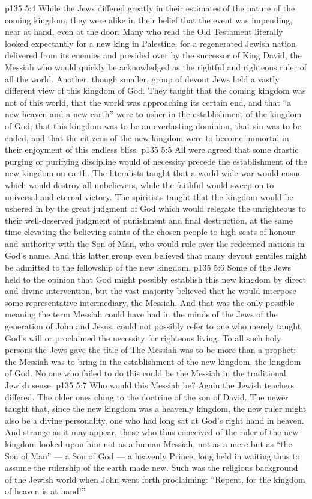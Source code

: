 \vs p135 5:4 While the Jews differed greatly in their estimates of the nature of the coming kingdom, they were alike in their belief that the event was impending, near at hand, even at the door. Many who read the Old Testament literally looked expectantly for a new king in Palestine, for a regenerated Jewish nation delivered from its enemies and presided over by the successor of King David, the Messiah who would quickly be acknowledged as the rightful and righteous ruler of all the world. Another, though smaller, group of devout Jews held a vastly different view of this kingdom of God. They taught that the coming kingdom was not of this world, that the world was approaching its certain end, and that “a new heaven and a new earth” were to usher in the establishment of the kingdom of God; that this kingdom was to be an everlasting dominion, that sin was to be ended, and that the citizens of the new kingdom were to become immortal in their enjoyment of this endless bliss.
\vs p135 5:5 All were agreed that some drastic purging or purifying discipline would of necessity precede the establishment of the new kingdom on earth. The literalists taught that a world\hyp{}wide war would ensue which would destroy all unbelievers, while the faithful would sweep on to universal and eternal victory. The spiritists taught that the kingdom would be ushered in by the great judgment of God which would relegate the unrighteous to their well\hyp{}deserved judgment of punishment and final destruction, at the same time elevating the believing saints of the chosen people to high seats of honour and authority with the Son of Man, who would rule over the redeemed nations in God’s name. And this latter group even believed that many devout gentiles might be admitted to the fellowship of the new kingdom.
\vs p135 5:6 Some of the Jews held to the opinion that God might possibly establish this new kingdom by direct and divine intervention, but the vast majority believed that he would interpose some representative intermediary, the Messiah. And that was the only possible meaning the term Messiah could have had in the minds of the Jews of the generation of John and Jesus.  could not possibly refer to one who merely taught God’s will or proclaimed the necessity for righteous living. To all such holy persons the Jews gave the title of  The Messiah was to be more than a prophet; the Messiah was to bring in the establishment of the new kingdom, the kingdom of God. No one who failed to do this could be the Messiah in the traditional Jewish sense.
\vs p135 5:7 Who would this Messiah be? Again the Jewish teachers differed. The older ones clung to the doctrine of the son of David. The newer taught that, since the new kingdom was a heavenly kingdom, the new ruler might also be a divine personality, one who had long sat at God’s right hand in heaven. And strange as it may appear, those who thus conceived of the ruler of the new kingdom looked upon him not as a human Messiah, not as a mere  but as “the Son of Man” --- a Son of God --- a heavenly Prince, long held in waiting thus to assume the rulership of the earth made new. Such was the religious background of the Jewish world when John went forth proclaiming: “Repent, for the kingdom of heaven is at hand!”
